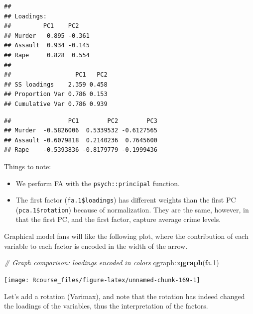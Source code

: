 \documentclass[]{book}
\newenvironment{Shaded}{\begin{snugshade}}{\end{snugshade}}
\newcommand{\KeywordTok}[1]{\textcolor[rgb]{0.13,0.29,0.53}{\textbf{{#1}}}}
\newcommand{\DataTypeTok}[1]{\textcolor[rgb]{0.13,0.29,0.53}{{#1}}}
\newcommand{\DecValTok}[1]{\textcolor[rgb]{0.00,0.00,0.81}{{#1}}}
\newcommand{\FloatTok}[1]{\textcolor[rgb]{0.00,0.00,0.81}{{#1}}}
\newcommand{\StringTok}[1]{\textcolor[rgb]{0.31,0.60,0.02}{{#1}}}
\newcommand{\CommentTok}[1]{\textcolor[rgb]{0.56,0.35,0.01}{\textit{{#1}}}}
\newcommand{\NormalTok}[1]{{#1}}
\providecommand{\tightlist}{%
  \setlength{\itemsep}{0pt}\setlength{\parskip}{0pt}}
\theoremstyle{definition}
\theoremstyle{definition}
\theoremstyle{remark}
\begin{document}
\begin{verbatim}
## 
## Loadings:
##         PC1    PC2   
## Murder   0.895 -0.361
## Assault  0.934 -0.145
## Rape     0.828  0.554
## 
##                  PC1   PC2
## SS loadings    2.359 0.458
## Proportion Var 0.786 0.153
## Cumulative Var 0.786 0.939
\end{verbatim}

\begin{Shaded}
\end{Shaded}

\begin{verbatim}
##                PC1        PC2        PC3
## Murder  -0.5826006  0.5339532 -0.6127565
## Assault -0.6079818  0.2140236  0.7645600
## Rape    -0.5393836 -0.8179779 -0.1999436
\end{verbatim}

Things to note:

\begin{itemize}
\tightlist
\item
  We perform FA with the \texttt{psych::principal} function.
\item
  The first factor (\texttt{fa.1\$loadings}) has different weights than
  the first PC (\texttt{pca.1\$rotation}) because of normalization. They
  are the same, however, in that the first PC, and the first factor,
  capture average crime levels.
\end{itemize}

Graphical model fans will like the following plot, where the
contribution of each variable to each factor is encoded in the width of
the arrow.

\begin{Shaded}
\begin{Highlighting}[]
\CommentTok{# Graph comparison: loadings encoded in colors}
\NormalTok{qgraph::}\KeywordTok{qgraph}\NormalTok{(fa}\FloatTok{.1}\NormalTok{)}
\end{Highlighting}
\end{Shaded}

\texttt{[image: Rcourse\_files/figure-latex/unnamed-chunk-169-1]}

Let's add a rotation (Varimax), and note that the rotation has indeed
changed the loadings of the variables, thus the interpretation of the
factors.

\begin{Shaded}
\end{Shaded}
\end{document}
